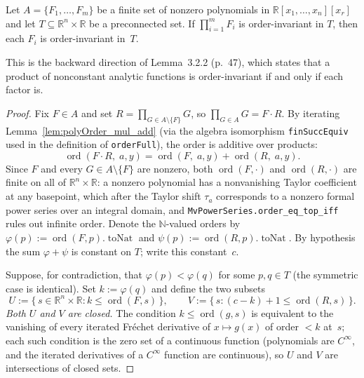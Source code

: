 \begin{lemma}
  \label{lem:order_invariant_full_factor_of_prod}
  \leanok
  Let $A = \{F_1, \ldots, F_m\}$ be a finite set of nonzero polynomials in
  $\mathbb{R}[x_1,\ldots,x_n][x_r]$ and let
  $T \subseteq \mathbb{R}^n \times \mathbb{R}$ be a preconnected set.
  If $\prod_{i=1}^m F_i$ is order-invariant in $T$, then each $F_i$ is
  order-invariant in~$T$.

  This is the backward direction of Lemma~3.2.2 (p.~47), which states that a product
  of nonconstant analytic functions is order-invariant if and only if each factor is.
\end{lemma}
\begin{proof}
  \leanok
  Fix $F \in A$ and set $R = \prod_{G \in A \setminus \{F\}} G$, so
  $\prod_{G \in A} G = F \cdot R$.  By iterating
  Lemma~\ref{lem:polyOrder_mul_add} (via the algebra isomorphism
  \texttt{finSuccEquiv} used in the definition of \texttt{orderFull}), the order
  is additive over products:
  \[
    \operatorname{ord}(F \cdot R,\; a, y)
      = \operatorname{ord}(F,\; a, y) + \operatorname{ord}(R,\; a, y).
  \]
  Since $F$ and every $G \in A \setminus \{F\}$ are nonzero, both
  $\operatorname{ord}(F, \cdot)$ and $\operatorname{ord}(R, \cdot)$ are finite
  on all of $\mathbb{R}^n \times \mathbb{R}$: a nonzero polynomial has a
  nonvanishing Taylor coefficient at any basepoint, which after the Taylor
  shift $\tau_a$ corresponds to a nonzero formal power series over an integral
  domain, and \texttt{MvPowerSeries.order\_eq\_top\_iff} rules out infinite
  order.  Denote the $\mathbb{N}$-valued orders by
  $\varphi(p) := \operatorname{ord}(F, p).\operatorname{toNat}$ and
  $\psi(p) := \operatorname{ord}(R, p).\operatorname{toNat}$.  By hypothesis
  the sum $\varphi + \psi$ is constant on $T$; write this constant~$c$.

  Suppose, for contradiction, that $\varphi(p) < \varphi(q)$ for some
  $p, q \in T$ (the symmetric case is identical).  Set $k := \varphi(q)$ and
  define the two subsets
  \[
    U := \{\, s \in \mathbb{R}^n \times \mathbb{R} : k \le \operatorname{ord}(F, s) \,\}, \qquad
    V := \{\, s : (c - k) + 1 \le \operatorname{ord}(R, s) \,\}.
  \]
  \emph{Both $U$ and $V$ are closed.}  The condition $k \le \operatorname{ord}(g, s)$
  is equivalent to the vanishing of every iterated Fr\'echet derivative of
  $x \mapsto g(x)$ of order $< k$ at~$s$; each such condition is the zero set
  of a continuous function (polynomials are $C^\infty$, and the iterated
  derivatives of a $C^\infty$ function are continuous), so $U$ and $V$ are
  intersections of closed sets.


\end{proof}
